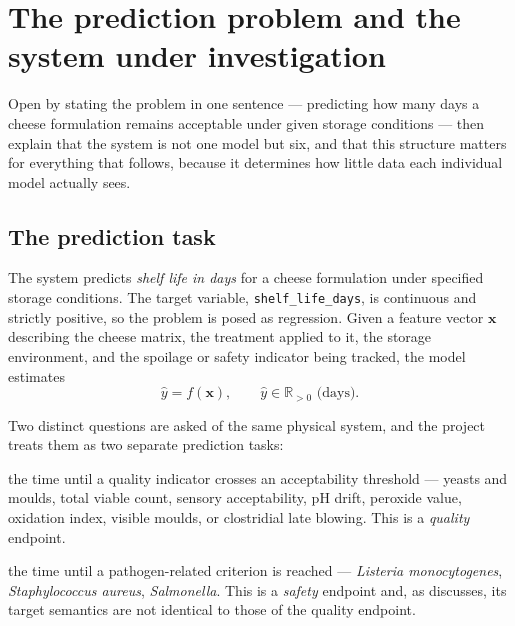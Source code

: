 \chapter{The prediction problem and the system under investigation}
\label{ch:context}

\begin{saybox}[title=What to say at the start of this section]
Open by stating the problem in one sentence --- predicting how many days a
cheese formulation remains acceptable under given storage conditions ---
then explain that the system is not one model but six, and that this
structure matters for everything that follows, because it determines how
little data each individual model actually sees.
\end{saybox}

\section{The prediction task}

The system predicts \emph{shelf life in days} for a cheese formulation
under specified storage conditions. The target variable,
\texttt{shelf\_life\_days}, is continuous and strictly positive, so the
problem is posed as regression. Given a feature vector $\mathbf{x}$
describing the cheese matrix, the treatment applied to it, the storage
environment, and the spoilage or safety indicator being tracked, the model
estimates
\begin{equation}
\hat{y} = f(\mathbf{x}), \qquad
\hat{y} \in \mathbb{R}_{>0} \text{ (days)} .
\end{equation}

Two distinct questions are asked of the same physical system, and the
project treats them as two separate prediction tasks:

\begin{description}[leftmargin=1.6em, style=nextline, font=\bfseries\color{dgreen}]
\item[General shelf life] the time until a quality indicator crosses an
  acceptability threshold --- yeasts and moulds, total viable count,
  sensory acceptability, pH drift, peroxide value, oxidation index, visible
  moulds, or clostridial late blowing. This is a \emph{quality} endpoint.
\item[Safety endpoint] the time until a pathogen-related criterion is
  reached --- \emph{Listeria monocytogenes}, \emph{Staphylococcus aureus},
  \emph{Salmonella}. This is a \emph{safety} endpoint and, as
   discusses, its target semantics are not identical
  to those of the quality endpoint.
\end{description}

